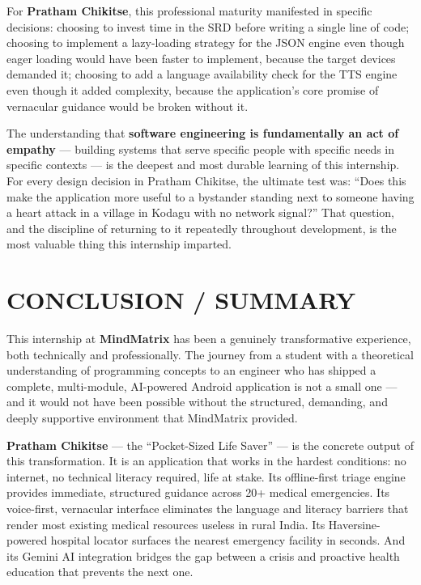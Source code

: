 \documentclass[12pt,a4paper]{report}
\begin{document}
\vspace{0.4cm}

For \textbf{Pratham Chikitse}, this professional maturity manifested in specific decisions: choosing to invest time in the SRD before writing a single line of code; choosing to implement a lazy-loading strategy for the JSON engine even though eager loading would have been faster to implement, because the target devices demanded it; choosing to add a language availability check for the TTS engine even though it added complexity, because the application's core promise of vernacular guidance would be broken without it.

\vspace{0.4cm}

The understanding that \textbf{software engineering is fundamentally an act of empathy} — building systems that serve specific people with specific needs in specific contexts — is the deepest and most durable learning of this internship. For every design decision in Pratham Chikitse, the ultimate test was: ``Does this make the application more useful to a bystander standing next to someone having a heart attack in a village in Kodagu with no network signal?'' That question, and the discipline of returning to it repeatedly throughout development, is the most valuable thing this internship imparted.

\newpage

\chapter{CONCLUSION / SUMMARY}

This internship at \textbf{MindMatrix} has been a genuinely transformative experience, both technically and professionally. The journey from a student with a theoretical understanding of programming concepts to an engineer who has shipped a complete, multi-module, AI-powered Android application is not a small one — and it would not have been possible without the structured, demanding, and deeply supportive environment that MindMatrix provided.

\vspace{0.4cm}

\textbf{Pratham Chikitse} — the ``Pocket-Sized Life Saver'' — is the concrete output of this transformation. It is an application that works in the hardest conditions: no internet, no technical literacy required, life at stake. Its offline-first triage engine provides immediate, structured guidance across 20+ medical emergencies. Its voice-first, vernacular interface eliminates the language and literacy barriers that render most existing medical resources useless in rural India. Its Haversine-powered hospital locator surfaces the nearest emergency facility in seconds. And its Gemini AI integration bridges the gap between a crisis and proactive health education that prevents the next one.
\end{document}
